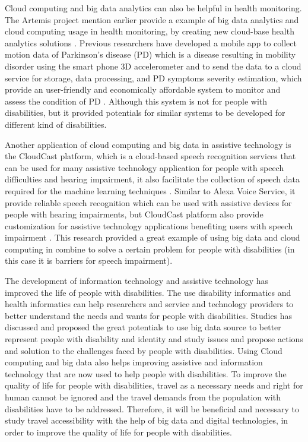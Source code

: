 Cloud computing and big data analytics can also be helpful in health monitoring. The Artemis project mention earlier
provide a example of big data analytics and cloud computing usage in health monitoring, by creating new cloud-base
health analytics solutions \cite{Khazaei14}. Previous researchers have developed a mobile app to collect motion 
data of Parkinson's disease (PD) which is a disease resulting in mobility disorder using the smart phone 3D 
accelerometer and to send the data to a cloud service for storage, data processing, and PD symptoms severity
estimation, which provide an user-friendly and economically affordable system to monitor and assess the condition
of PD \cite{info:doi/10.2196/mhealth.3956}. Although this system is not for people with disabilities, but it 
provided potentials for similar systems to be developed for different kind of disabilities. 

Another application of cloud computing and big data in assistive technology is the CloudCast platform, which is a 
cloud-based speech recognition services that can be used for many assistive technology application for people
with speech difficulties and hearing impairment, it also facilitate the collection of speech data required for
the machine learning techniques \cite{cunningham2017cloud}. Similar to Alexa Voice Service, it provide reliable 
speech recognition which can be used with assistive devices for people with hearing impairments, but CloudCast
platform also provide customization for assistive technology applications benefiting users with speech 
impairment \cite{cunningham2017cloud}. This research provided a great example of using big data and cloud 
computing in combine to solve a certain problem for people with disabilities (in this case it is barriers for speech impairment). 

The development of information technology and assistive technology has improved the life of people with disabilities.
The use disability informatics and health informatics can help researchers and service and technology providers 
to better understand the needs and wants for people with disabilities. Studies has discussed and proposed the 
great potentials to use big data source to better represent people with disability and identity and study 
issues and propose actions and solution to the challenges faced by people with disabilities. Using Cloud 
computing and big data also helps improving assistive and information technology that are now used to 
help people with disabilities. To improve the quality of life for people with disabilities, travel as a necessary needs and right for human cannot be ignored and the travel demands from the population with disabilities have to be addressed. Therefore, it will be beneficial and necessary to study travel accessibility with the help of big data and digital technologies, in order to improve the quality of life for people with disabilities. 

